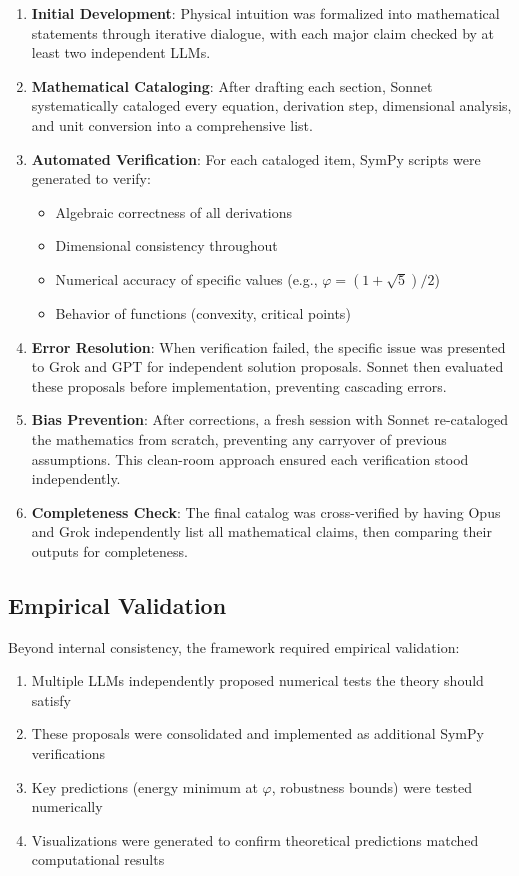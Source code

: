 \documentclass[11pt]{article}
\theoremstyle{remark}
\theoremstyle{definition}
\begin{document}
\begin{enumerate}
\item \textbf{Initial Development}: Physical intuition was formalized into mathematical statements through iterative dialogue, with each major claim checked by at least two independent LLMs.

\item \textbf{Mathematical Cataloging}: After drafting each section, Sonnet systematically cataloged every equation, derivation step, dimensional analysis, and unit conversion into a comprehensive list.

\item \textbf{Automated Verification}: For each cataloged item, SymPy scripts were generated to verify:
   \begin{itemize}
   \item Algebraic correctness of all derivations
   \item Dimensional consistency throughout
   \item Numerical accuracy of specific values (e.g., $\varphi = (1+\sqrt{5})/2$)
   \item Behavior of functions (convexity, critical points)
   \end{itemize}

\item \textbf{Error Resolution}: When verification failed, the specific issue was presented to Grok and GPT for independent solution proposals. Sonnet then evaluated these proposals before implementation, preventing cascading errors.

\item \textbf{Bias Prevention}: After corrections, a fresh session with Sonnet re-cataloged the mathematics from scratch, preventing any carryover of previous assumptions. This clean-room approach ensured each verification stood independently.

\item \textbf{Completeness Check}: The final catalog was cross-verified by having Opus and Grok independently list all mathematical claims, then comparing their outputs for completeness.
\end{enumerate}

\subsection{Empirical Validation}
Beyond internal consistency, the framework required empirical validation:

\begin{enumerate}
\item Multiple LLMs independently proposed numerical tests the theory should satisfy
\item These proposals were consolidated and implemented as additional SymPy verifications
\item Key predictions (energy minimum at $\varphi$, robustness bounds) were tested numerically
\item Visualizations were generated to confirm theoretical predictions matched computational results
\end{enumerate}
\end{document}
